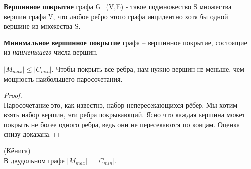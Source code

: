 \begin{Def}
	\textbf{Вершинное покрытие} графа G=(V,E)  - такое подмножество S множества вершин графа V, что любое ребро этого графа инцидентно хотя бы одной вершине из множества S.
\end{Def}

\begin{Def}
	\textbf{Минимальное вершинное покрытие} графа -- вершинное покрытие, состоящие из \textit{наименьшего} числа вершин.
\end{Def}

\begin{prop}
	$\lvert M_{max} \rvert \leq \lvert C_{min} \rvert$.
	Чтобы покрыть все ребра, нам нужно вершин не меньше, чем мощность наибольшего паросочетания.
\end{prop}

\begin{proof} \ \\
	Паросочетание это, как известно, набор непересекающихся рёбер. Мы хотим взять набор вершин, эти ребра покрывающий. Ясно что каждая вершина может покрыть не более одного ребра, ведь они не пересекаются по концам. Оценка снизу доказана.
\end{proof}

\begin{theorem} (Кёнига) \\
	В двудольном графе $\lvert M_{max} \rvert = \lvert C_{min} \rvert$.
\end{theorem}

